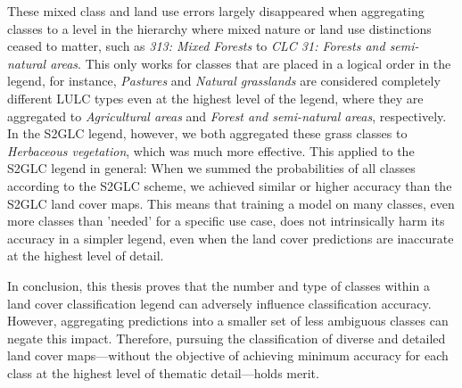             These mixed class and land use errors largely disappeared when aggregating classes to a level in the hierarchy where mixed nature or land use distinctions ceased to matter, such as \textit{313: Mixed Forests} to \textit{CLC 31: Forests and semi-natural areas}. This only works for classes that are placed in a logical order in the legend, for instance, \textit{Pastures} and \textit{Natural grasslands} are considered completely different LULC types even at the highest level of the legend, where they are aggregated to \textit{Agricultural areas} and \textit{Forest and semi-natural areas}, respectively. In the S2GLC legend, however, we both aggregated these grass classes to \textit{Herbaceous vegetation}, which was much more effective. This applied to the S2GLC legend in general: When we summed the probabilities of all classes according to the S2GLC scheme, we achieved similar or higher accuracy than the S2GLC land cover maps. This means that training a model on many classes, even more classes than 'needed' for a specific use case, does not intrinsically harm its accuracy in a simpler legend, even when the land cover predictions are inaccurate at the highest level of detail.

        In conclusion, this thesis proves that the number and type of classes within a land cover classification legend can adversely influence classification accuracy. However, aggregating predictions into a smaller set of less ambiguous classes can negate this impact. Therefore, pursuing the classification of diverse and detailed land cover maps---without the objective of achieving minimum accuracy for each class at the highest level of thematic detail---holds merit.
    
